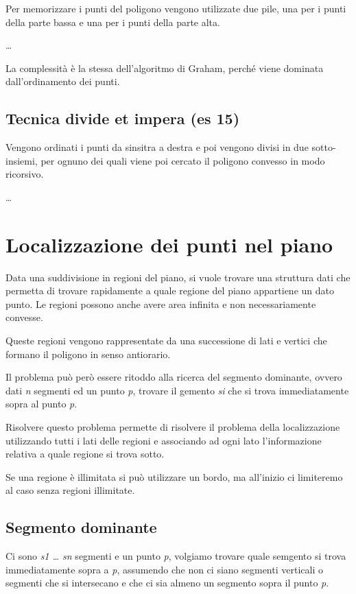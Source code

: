 Per memorizzare i punti del poligono vengono utilizzate due pile, una
per i punti della parte bassa e una per i punti della parte alta.

\ldots{}

La complessità è la stessa dell'algoritmo di Graham, perché viene
dominata dall'ordinamento dei punti.

\subsection{Tecnica divide et impera (es
15)}\label{tecnica-divide-et-impera-es-15}

Vengono ordinati i punti da sinsitra a destra e poi vengono divisi in
due sotto-insiemi, per ognuno dei quali viene poi cercato il poligono
convesso in modo ricorsivo.

\ldots{}

\section{Localizzazione dei punti nel
piano}\label{localizzazione-dei-punti-nel-piano}

Data una suddivisione in regioni del piano, si vuole trovare una
struttura dati che permetta di trovare rapidamente a quale regione del
piano appartiene un dato punto. Le regioni possono anche avere area
infinita e non necessariamente convesse.

Queste regioni vengono rappresentate da una successione di lati e
vertici che formano il poligono in senso antiorario.

Il problema può però essere ritoddo alla ricerca del segmento dominante,
ovvero dati \emph{n} segmenti ed un punto \emph{p}, trovare il gemento
\emph{si} che si trova immediatamente sopra al punto \emph{p}.

Risolvere questo problema permette di risolvere il problema della
localizzazione utilizzando tutti i lati delle regioni e associando ad
ogni lato l'informazione relativa a quale regione si trova sotto.

Se una regione è illimitata si può utilizzare un bordo, ma all'inizio ci
limiteremo al caso senza regioni illimitate.

\subsection{Segmento dominante}\label{segmento-dominante}

Ci sono \emph{s1 \ldots{} sn} segmenti e un punto \emph{p}, volgiamo
trovare quale semgento si trova immediatamente sopra a \emph{p},
assumendo che non ci siano segmenti verticali o segmenti che si
intersecano e che ci sia almeno un segmento sopra il punto \emph{p}.

